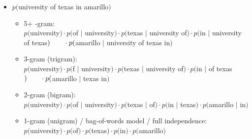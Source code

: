 \documentclass[11pt,letterpaper]{article}
\begin{document}
\begin{itemize}
  \item $p($university of texas in amarillo$)$
    \begin{itemize}
      \item 5+ -gram: \\
            $p($university$) \cdot 
             p($of $\mid$ university$) \cdot 
             p($texas $\mid$ university of$) \cdot 
             p($in $\mid$ university of texas$) \\
      ~~~~~~ \cdot p($amarillo $\mid$ university of texas in$)$
      \item 3-gram (trigram): \\
            $p($university$) \cdot 
             p($f $\mid$ university$) \cdot 
             p($texas $\mid$ university of$) \cdot 
             p($in $\mid$ of texas$) \\
      ~~~~~~ \cdot p($amarillo $\mid$ texas in$)$
      \item 2-gram (bigram): \\
            $p($university$) \cdot 
             p($of $\mid$ university$) \cdot 
             p($texas $\mid$ of$) \cdot 
             p($in $\mid$ texas$) \cdot
             p($amarillo $\mid$ in$)$
      \item 1-gram (unigram) / bag-of-words model / full independence: \\
            $p($university$) \cdot 
             p($of$) \cdot 
             p($texas$) \cdot 
             p($in$) \cdot
             p($amarillo$)$
    \end{itemize}


\end{itemize}
\end{document}
